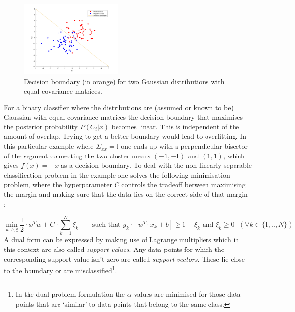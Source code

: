 
\begingroup
\setlength{\columnsep}{0.5cm}
\setlength{\intextsep}{0.5cm}
\begin{figure}
\includegraphics[width=0.45\textwidth]{../src/figures/twogaussians.pdf}
\caption{Decision boundary (in orange) for two Gaussian distributions with equal covariance matrices.}
\label{twogaussians}
\end{figure}
For a binary classifier where the distributions are (assumed or known to be) Gaussian with equal covariance matrices the decision boundary that maximises the posterior probability $P(C_i|x)$ becomes linear. This is independent of the amount of overlap. Trying to get a better boundary would lead to overfitting. In this particular example where $\Sigma_{xx}=\mathbb{I}$ one ends up with a perpendicular bisector of the segment connecting the two cluster means 
$(-1,-1)$ and $(1,1)$, which gives $f(x)=-x$ as a decision boundary.
To deal with the non-linearly separable classification problem in the example one solves the following minimisation problem, where the hyperparameter $C$ controls the tradeoff between maximising the margin and making sure that the data lies on the correct side of that margin :

\endgroup
\vspace{-0.5cm}
$$\min_{w,b,\xi}\frac{1}{2}\cdot w^Tw+C\cdot \sum_{k=1}^N\xi_k\qquad\text{such that $y_k\cdot[w^T\cdot x_k+b]\geq 1-\xi_k$ and $\xi_k\geq 0$ $(\forall k\in\{1,..,N\})$}$$
A dual form can be expressed by making use of Lagrange multipliers which in this context are also called \textit{support values}. Any data points for which the corresponding support value isn't zero are called \textit{support vectors}. These lie close to the boundary or are misclassified\footnote{In the dual problem formulation the $\alpha$ values are minimised for those data points that are `similar' to data points that belong to the same class.}.

